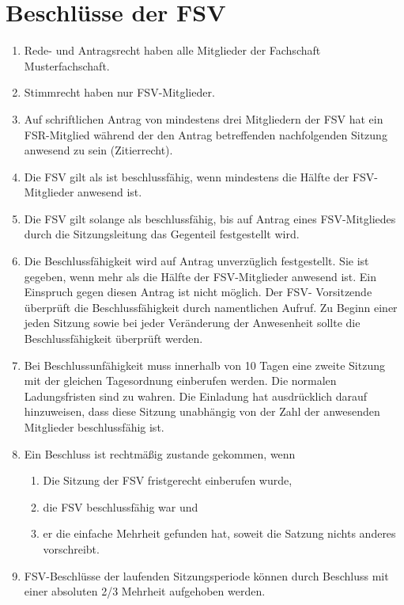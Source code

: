 \documentclass{article}
\newcommand{\fachschaft}{Musterfachschaft}
\begin{document}
\section{Beschlüsse der FSV}
\begin{enumerate}[(1)]
    \item Rede- und Antragsrecht haben alle Mitglieder der Fachschaft \fachschaft.
    \item Stimmrecht haben nur FSV-Mitglieder.
    \item Auf schriftlichen Antrag von mindestens drei Mitgliedern der FSV hat ein FSR-Mitglied während der den Antrag betreffenden nachfolgenden Sitzung anwesend zu sein (Zitierrecht).
    \item Die FSV gilt als ist beschlussfähig, wenn mindestens die Hälfte der FSV-Mitglieder anwesend ist.
    \item Die FSV gilt solange als beschlussfähig, bis auf Antrag eines FSV-Mitgliedes durch die Sitzungsleitung das Gegenteil festgestellt wird.
	\item Die Beschlussfähigkeit wird auf Antrag unverzüglich festgestellt. Sie ist gegeben, wenn mehr als die Hälfte der FSV-Mitglieder anwesend ist. Ein Einspruch gegen diesen Antrag ist nicht möglich. Der FSV- Vorsitzende überprüft die Beschlussfähigkeit durch namentlichen Aufruf. Zu Beginn einer jeden Sitzung sowie bei jeder Veränderung der Anwesenheit sollte die Beschlussfähigkeit überprüft werden.
	\item Bei Beschlussunfähigkeit muss innerhalb von 10 Tagen eine zweite Sitzung mit der gleichen Tagesordnung einberufen werden. Die normalen Ladungsfristen sind zu wahren. Die Einladung hat ausdrücklich darauf hinzuweisen, dass diese Sitzung unabhängig von der Zahl der anwesenden Mitglieder beschlussfähig ist.
	\item Ein Beschluss ist rechtmäßig zustande gekommen, wenn
	\begin{enumerate}[1.]
		\item Die Sitzung der FSV fristgerecht einberufen wurde,
		\item die FSV beschlussfähig war und
		\item er die einfache Mehrheit gefunden hat, soweit die Satzung nichts anderes vorschreibt.
	\end{enumerate}
	\item FSV-Beschlüsse der laufenden Sitzungsperiode können durch Beschluss mit einer absoluten 2/3 Mehrheit aufgehoben werden.
\end{enumerate}
\end{document}
